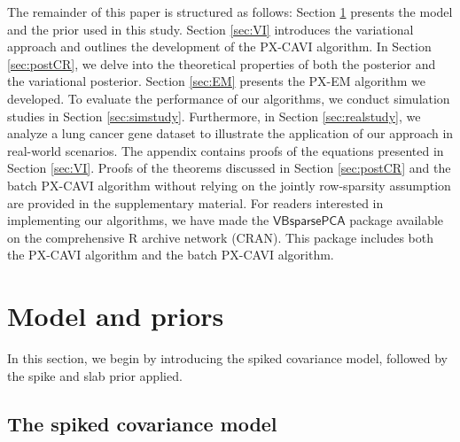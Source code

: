 \documentclass[pdftex, noinfoline, letter]{imsart}
\theoremstyle{plain}
\begin{document}
The remainder of this paper is structured as follows:
Section \ref{sec:model-and-priors} presents the model and the prior used in this study.
Section \ref{sec:VI} introduces the variational approach and outlines the development of the PX-CAVI algorithm.
In Section \ref{sec:postCR}, we delve into the theoretical properties of both the posterior and the variational posterior.
Section \ref{sec:EM} presents the PX-EM algorithm we developed.
To evaluate the performance of our algorithms, we conduct simulation studies in Section \ref{sec:simstudy}.
Furthermore, in Section \ref{sec:realstudy}, we analyze a lung cancer gene dataset to illustrate the application of our approach in real-world scenarios.
The appendix contains proofs of the equations presented in Section \ref{sec:VI}.
Proofs of the theorems discussed in Section \ref{sec:postCR} and the batch PX-CAVI algorithm without relying on the jointly row-sparsity assumption are provided in the supplementary material. For readers interested in implementing our algorithms, we have made the $\mathsf{VBsparsePCA}$ package available on the comprehensive R archive network (CRAN). This package includes both the PX-CAVI algorithm and the batch PX-CAVI algorithm.

\section{Model and priors}
\label{sec:model-and-priors}

In this section, we begin by introducing the spiked covariance model, followed by the spike and slab prior applied.

\subsection{The spiked covariance model}
\end{document}
